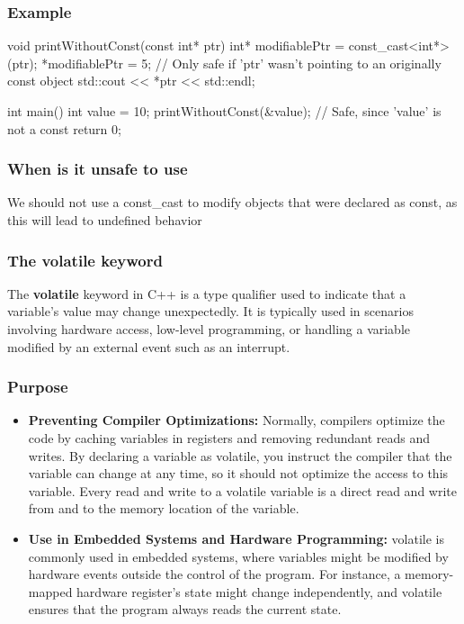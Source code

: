 \documentclass{report}
\begin{document}
    \bigbreak \noindent 
    \subsubsection{Example}
    \bigbreak \noindent 
    \begin{cppcode}
void printWithoutConst(const int* ptr) {
    int* modifiablePtr = const_cast<int*>(ptr);
    *modifiablePtr = 5; // Only safe if 'ptr' wasn't pointing to an originally const object
    std::cout << *ptr << std::endl;
}

int main() {
    int value = 10;
    printWithoutConst(&value); // Safe, since 'value' is not a const
    return 0;
}
    \end{cppcode}

    \bigbreak \noindent 
    \subsubsection{When is it unsafe to use}
    \bigbreak \noindent 
    We should not use a const\_cast to modify objects that were declared as const, as this will lead to undefined behavior

    \bigbreak \noindent 
    \subsubsection{The volatile keyword}
    \bigbreak \noindent 
    \begin{concept}
        The \textbf{volatile} keyword in C++ is a type qualifier used to indicate that a variable's value may change unexpectedly. It is typically used in scenarios involving hardware access, low-level programming, or handling a variable modified by an external event such as an interrupt.
    \end{concept}
    \bigbreak \noindent 
    \subsubsection{Purpose}
    \begin{itemize}
        \item \textbf{Preventing Compiler Optimizations:} Normally, compilers optimize the code by caching variables in registers and removing redundant reads and writes. By declaring a variable as volatile, you instruct the compiler that the variable can change at any time, so it should not optimize the access to this variable. Every read and write to a volatile variable is a direct read and write from and to the memory location of the variable.
        \item \textbf{Use in Embedded Systems and Hardware Programming:} volatile is commonly used in embedded systems, where variables might be modified by hardware events outside the control of the program. For instance, a memory-mapped hardware register's state might change independently, and volatile ensures that the program always reads the current state.
    \end{itemize}
    
\end{document}
